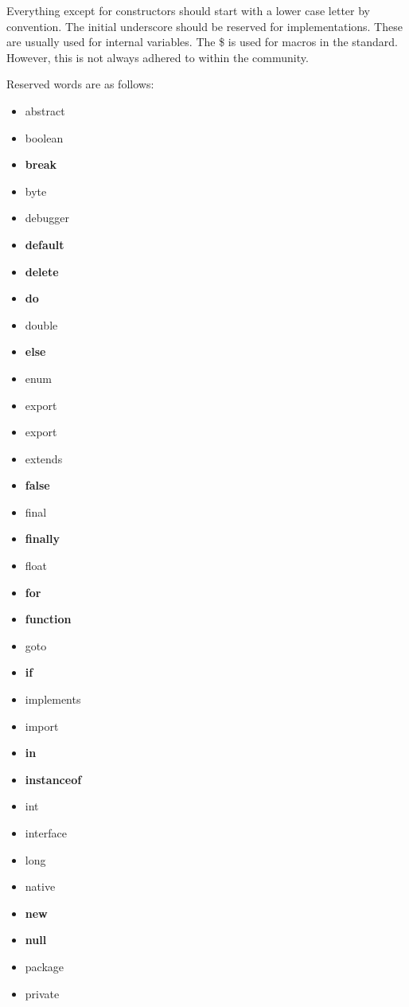\documentclass[a4paper,11pt]{report}
\begin{document}
			Everything except for constructors should start with a lower case letter by convention. 
			The initial underscore should be reserved for implementations. 
			These are usually used for internal variables. 
			The \$ is used for macros in the standard. 
			However, this is not always adhered to within the community. 

			Reserved words are as follows:
			\begin{multicols}{3}
				\begin{itemize}
					\item abstract
					\item boolean
					\item \textbf{break}
					\item byte
					\item debugger
					\item \textbf{default}
					\item \textbf{delete}
					\item \textbf{do}
					\item double
					\item \textbf{else}
					\item enum
					\item export
					\item export
					\item extends
					\item \textbf{false}
					\item final
					\item \textbf{finally}
					\item float
					\item \textbf{for}
					\item \textbf{function}
					\item goto
					\item \textbf{if}
					\item implements
					\item import
					\item \textbf{in}
					\item \textbf{instanceof}
					\item int
					\item interface
					\item long
					\item native 
					\item \textbf{new}
					\item \textbf{null}
					\item package
					\item private

\end{itemize}
\end{multicols}
\end{document}
